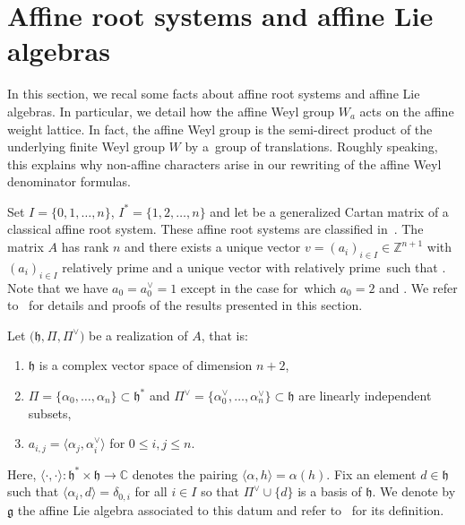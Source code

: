 \documentclass[10pt,a4paper]{amsart}
\numberwithin{equation}{section}
\newcommand{\al}{\alpha}
\newcommand{\fh}{\mathfrak{h}}
\newcommand{\fg}{\mathfrak{g}}
\newcommand{\scal}[2]{\langle #1,#2\rangle}
\newcommand{\Z}{\mathbb{Z}}
\begin{document}
\section{Affine root systems and affine Lie algebras}\label{sec:2}


In this section, we recal some facts about affine root systems and affine Lie algebras. In particular, we detail how the affine Weyl group $W_a$ acts on the affine weight lattice. In fact, the affine Weyl group is the semi-direct product of the underlying finite Weyl group $W$ by a~group of translations. Roughly speaking, this explains why non-affine characters arise in our rewriting of the affine Weyl denominator formulas.

Set $I=\{0,1,\dots,n\}$, $I^\ast=\{1,2,\dots,n\}$ and let  be a generalized Cartan matrix of a classical affine root system. These affine root systems
are classified in~\cite[p.~54, Table~1]{KacB}. The
matrix $A$ has rank $n$ and there exists a unique vector $v = (a_i)_{i\in I}\in\mathbb{Z}^{n+1}$ with $(a_i)_{i\in I}$ relatively prime and a unique vector \smash{$v^{\vee} =\bigl(a_i^\vee\bigr)_{i\in I}\in \Z^{n+1}$} with  relatively prime~such that . Note that we have $a_0=a_0^\vee = 1$ except in the  case for~which $a_0=2$ and . We refer to~\cite{carter_affine,KacB} for details and proofs of the results presented in this section.

Let $\bigl(\fh,\Pi,\Pi^\vee\bigr)$ be a realization of $A$, that is:
\begin{enumerate}\itemsep=0pt
\item[(1)] $\fh$ is a complex vector space of dimension $n+2$,
\item[(2)] $\Pi=\{\al_0,\dots,\al_n\}\subset \fh^\ast$ and $\Pi^\vee = \big\{\al_0^\vee,\dots,\al_n^\vee\big\}\subset \fh$ are linearly independent subsets,
\item[(3)] $a_{i,j} = \bigl\langle\al_j,\al^\vee_i\bigr\rangle$ for $0\leq i,j\leq n$.
\end{enumerate}
Here, $\scal{\cdot}{\cdot}\colon \fh^\ast\times \fh\to \mathbb{C}$ denotes the pairing $\scal{\al}{h} = \al(h)$.
Fix an element $d\in \fh$ such that $\scal{\al_i}{d} = \delta_{0,i}$ for all $i\in I$ so that $\Pi^\vee\cup \{d\}$ is a basis of $\fh$.
We denote by $\fg$ the affine Lie algebra associated to this datum and refer to~\cite{KacB} for its definition.
\end{document}
